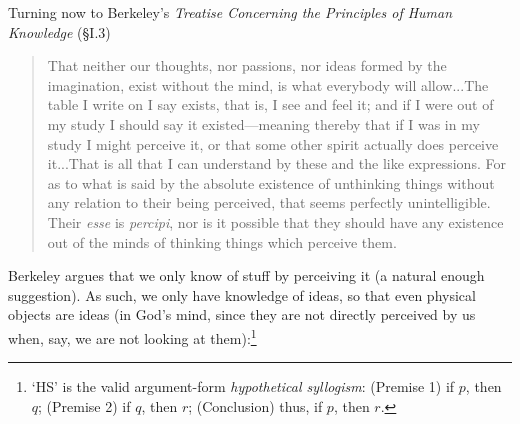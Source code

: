 \documentclass[oneside,letterpaper,12pt]{book}
\begin{document}
Turning now to Berkeley's \textit{Treatise Concerning the Principles of Human Knowledge} (\S I.3)
\begin{quote}
	That neither our thoughts, nor passions, nor ideas formed by the imagination, exist without the mind, is what everybody will allow...The table I write on I say exists, that is, I see and feel it; and if I were out of my study I should say it existed---meaning thereby that if I was in my study I might perceive it, or that some other spirit actually does perceive it...That is all that I can understand by these and the like expressions. For as to what is said by the absolute existence of unthinking things without any relation to their being perceived, that seems perfectly unintelligible. Their \textit{esse} is \textit{percipi}, nor is it possible that they should have any existence out of the minds of thinking things which perceive them.
\end{quote}
Berkeley argues that we only know of stuff by perceiving it (a natural enough suggestion). As such, we only have knowledge of ideas, so that even physical objects are ideas (in God's mind, since they are not directly perceived by us when, say, we are not looking at them):\footnote{`HS' is the valid argument-form \textit{hypothetical syllogism}: (Premise 1) if $p$, then $q$; (Premise 2) if $q$, then $r$; (Conclusion) thus, if $p$, then $r$.}
\end{document}
